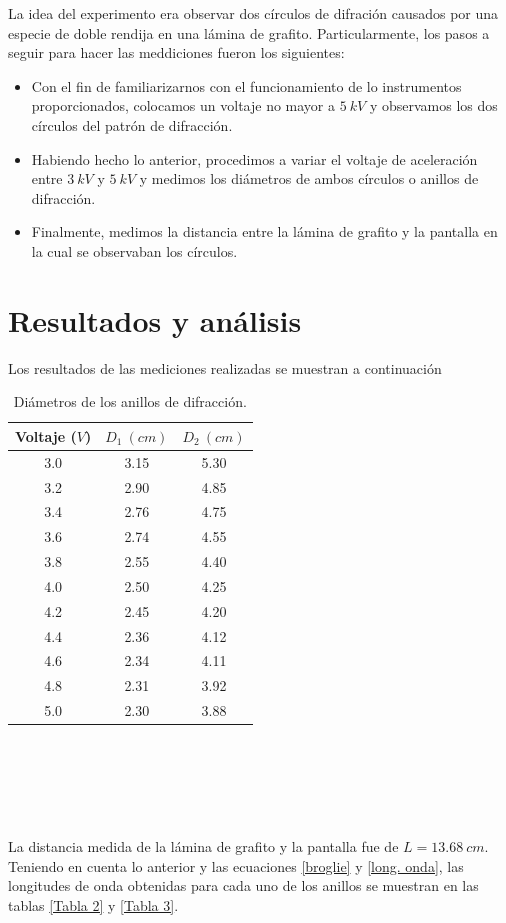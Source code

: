 \documentclass[prb,aps,twocolumn,preprintnumbers,amsmath,amssymb]{revtex4}
\begin{document}
La idea del experimento era observar dos círculos de difración causados por una especie de doble rendija en una lámina de grafito. Particularmente, los pasos a seguir para hacer las meddiciones fueron los siguientes:

\begin{itemize}
	\item Con el fin de familiarizarnos con el funcionamiento de lo instrumentos proporcionados, colocamos un voltaje no mayor a $5\ kV$ y observamos los dos círculos del patrón de difracción. 
	
	\item Habiendo hecho lo anterior, procedimos a variar el voltaje de aceleración entre $3\ kV$ y $5\ kV$ y medimos los diámetros de ambos círculos o anillos de difracción.
	
	\item Finalmente, medimos la distancia entre la lámina de grafito y la pantalla en la cual se observaban los círculos.
\end{itemize}

\section{Resultados y análisis}

Los resultados de las mediciones realizadas se muestran a continuación

\begin{table}[h!]
	\caption{\label{Tabla 1}Diámetros de los anillos de difracción.}
	\begin{ruledtabular}
		\begin{tabular}{|ccc|}
			Voltaje ($V$) & $D_{1}\ (cm)$ & $D_{2}\ (cm)$\\
			\hline
			3.0 & 3.15 & 5.30\\
			3.2 & 2.90 & 4.85\\
			3.4 & 2.76 & 4.75\\
			3.6 & 2.74 & 4.55\\
			3.8 & 2.55 & 4.40\\
			4.0 & 2.50 & 4.25\\
			4.2 & 2.45 & 4.20\\
			4.4 & 2.36 & 4.12\\
			4.6 & 2.34 & 4.11\\
			4.8 & 2.31 & 3.92\\
			5.0 & 2.30 & 3.88\\
		\end{tabular}
	\end{ruledtabular}
\end{table}
\
\\\\\\\\\\
La distancia medida	de la lámina de grafito y la pantalla fue de $L = 13.68\ cm$. Teniendo en cuenta lo anterior y las ecuaciones \eqref{broglie} y \eqref{long. onda}, las longitudes de onda obtenidas para cada uno de los anillos se muestran en las tablas \ref{Tabla 2} y \ref{Tabla 3}.
\end{document}
